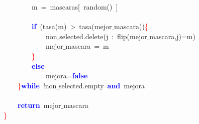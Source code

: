 \mbox{}\ \ \ \ \ \ \ \ m\ \textcolor{BrickRed}{=}\ mascaras\textcolor{BrickRed}{[}\ random\textcolor{BrickRed}{()}\ \textcolor{BrickRed}{]} \\
\mbox{} \\
\mbox{}\ \ \ \ \ \ \ \ \textbf{\textcolor{Blue}{if}}\ \textcolor{BrickRed}{(}tasa\textcolor{BrickRed}{(}m\textcolor{BrickRed}{)}\ \textcolor{BrickRed}{\textgreater{}}\ tasa\textcolor{BrickRed}{(}mejor$\_$mascara\textcolor{BrickRed}{))}\textcolor{Red}{\{} \\
\mbox{}\ \ \ \ \ \ \ \ \ \ \ \ non$\_$selected\textcolor{BrickRed}{.}delete\textcolor{BrickRed}{(}j\ \textcolor{BrickRed}{:}\ flip\textcolor{BrickRed}{(}mejor$\_$mascara\textcolor{BrickRed}{,}j\textcolor{BrickRed}{)=}m\textcolor{BrickRed}{)} \\
\mbox{}\ \ \ \ \ \ \ \ \ \ \ \ mejor$\_$mascara\ \textcolor{BrickRed}{=}\ m \\
\mbox{}\ \ \ \ \ \ \ \ \textcolor{Red}{\}} \\
\mbox{}\ \ \ \ \ \ \ \ \textbf{\textcolor{Blue}{else}} \\
\mbox{}\ \ \ \ \ \ \ \ \ \ \ \ mejora\textcolor{BrickRed}{=}\textbf{\textcolor{Blue}{false}} \\
\mbox{}\ \ \ \ \textcolor{Red}{\}}\textbf{\textcolor{Blue}{while}}\ \textcolor{BrickRed}{!}non$\_$selected\textcolor{BrickRed}{.}empty\ \textbf{\textcolor{Blue}{and}}\ mejora \\
\mbox{} \\
\mbox{}\ \ \ \ \textbf{\textcolor{Blue}{return}}\ mejor$\_$mascara \\
\mbox{}\textcolor{Red}{\}} \\
\mbox{}
